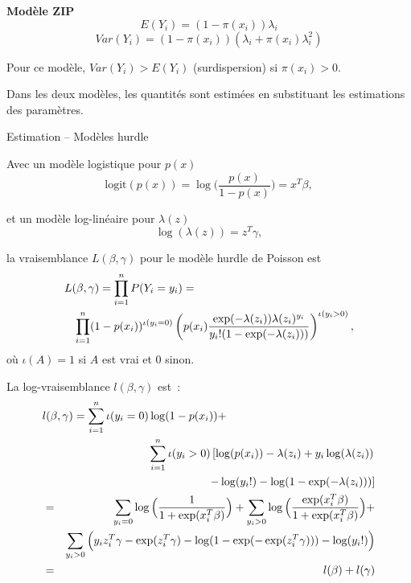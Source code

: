 \documentclass{BeamerTemplate}
\begin{document}
\begin{refsection}
\begin{frame}{}
\textbf{Modèle ZIP}
$$E(Y_i) = (1-\pi(x_i)) \lambda_i$$
$$Var(Y_i) = (1-\pi(x_i)) (\lambda_i+\pi(x_i) \lambda_i^2)$$

\bigskip
Pour ce modèle, $Var(Y_i) > E(Y_i)$ (surdispersion) si $\pi(x_i)>0$.

\bigskip
\bigskip
Dans les deux modèles, les quantités sont estimées en substituant les estimations des paramètres. 

\end{frame}

\begin{frame}{Estimation -- Modèles hurdle}

Avec un modèle logistique pour $p(x)$
$$\mbox{logit}(p(x)) = \log \Big(\frac{p(x)}{1-p(x)} \Big) = x^T
\beta,$$

et un modèle log-linéaire pour $\lambda(z)$
$$\log(\lambda(z)) = z^T \gamma,$$

la vraisemblance $L(\beta,\gamma)$ pour le modèle hurdle de Poisson est
\begin{eqnarray*}
\lefteqn{L(\beta,\gamma) = \prod_{i=1}^n P(Y_i = y_i) = }\\
&&\prod_{i=1}^n (1-p(x_i))^{\iota(y_i=0)}  \left( p(x_i)\frac{\exp(-\lambda(z_i))
\lambda(z_i)^{y_i}}{y_i! (1-\exp(-\lambda(z_i)))} \right)^{\iota(y_i>0)},
\end{eqnarray*}
où $\iota(A)=1$ si $A$ est vrai et $0$ sinon.
\end{frame}

\begin{frame}{}
La log-vraisemblance $l(\beta,\gamma)$ est~:
\begin{eqnarray*}
\lefteqn{l(\beta,\gamma) =  \sum_{i=1}^n \iota(y_i=0) \log(1-p(x_i)) + }\\
& & \sum_{i=1}^n \iota(y_i>0) \left[ \log(p(x_i)) -\lambda(z_i) + y_i
\log(\lambda(z_i)) \right.\\
& &\left. - \log(y_i!) - \log(1-\exp(-\lambda(z_i))) \right]  \\
& = & \sum_{y_i=0} \log\Big( \frac{1}{1+\exp(x_i^T \beta)} \Big) + \sum_{y_i>0} \log\Big(\frac{\exp(x_i^T \beta)}{1+\exp(x_i^T \beta)} \Big)+\\
& & \sum_{y_i>0} \Big(y_i z_i^T \gamma - \exp(z_i^T \gamma) -  \log(1- \exp(-\exp(z_i^T \gamma))) - \log(y_i!)\Big)\\
& = & l(\beta)+l(\gamma)
\end{eqnarray*}

\end{frame}


\end{refsection}
\end{document}
